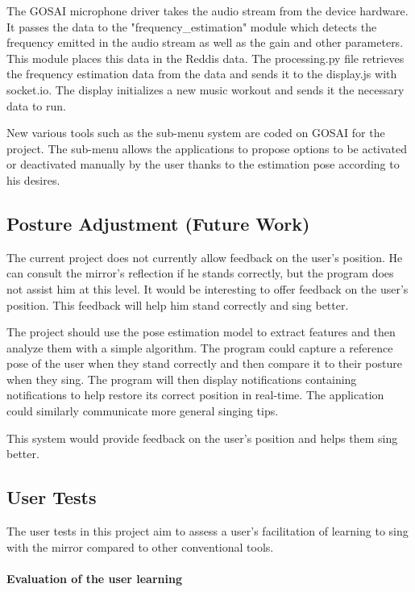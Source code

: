 The GOSAI microphone driver takes the audio stream from the device hardware. It passes the data to the "frequency\_estimation" module which detects the frequency emitted in the audio stream as well as the gain and other parameters. This module places this data in the Reddis data. The processing.py file retrieves the frequency estimation data from the data and sends it to the display.js with socket.io. The display initializes a new music workout and sends it the necessary data to run.

New various tools such as the sub-menu system are coded on GOSAI for the project. The sub-menu allows the applications to propose options to be activated or deactivated manually by the user thanks to the estimation pose according to his desires.

\subsection{Posture Adjustment (Future Work)}

The current project does not currently allow feedback on the user's position. He can consult the mirror's reflection if he stands correctly, but the program does not assist him at this level. It would be interesting to offer feedback on the user's position. This feedback will help him stand correctly and sing better. 

The project should use the pose estimation model to extract features and then analyze them with a simple algorithm. The program could capture a reference pose of the user when they stand correctly and then compare it to their posture when they sing. The program will then display notifications containing notifications to help restore its correct position in real-time. The application could similarly communicate more general singing tips. 

This system would provide feedback on the user's position and helps them sing better.

\subsection{User Tests}

The user tests in this project aim to assess a user’s facilitation of learning to sing with the
mirror compared to other conventional tools.

\paragraph{Evaluation of the user learning}

